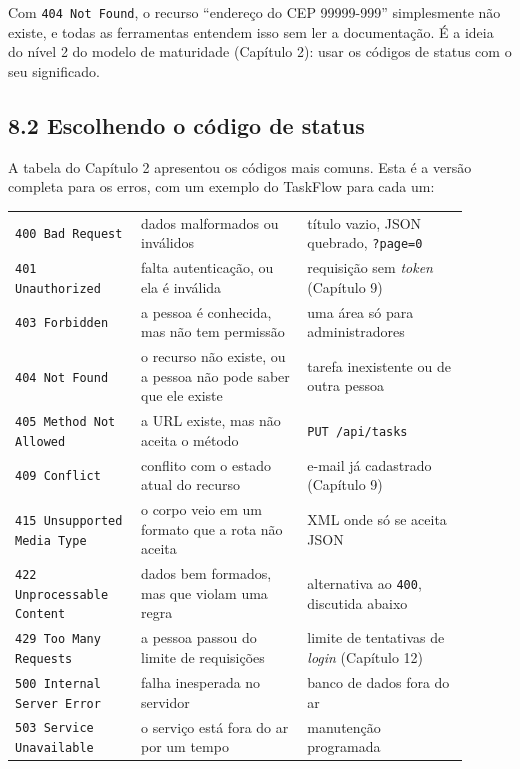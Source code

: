 Com \texttt{404 Not Found}, o recurso ``endereço do CEP 99999-999'' simplesmente não existe, e todas as ferramentas entendem isso sem ler a documentação. É a ideia do nível 2 do modelo de maturidade (Capítulo 2): usar os códigos de status com o seu significado.

\subsection{8.2 Escolhendo o código de status}

A tabela do Capítulo 2 apresentou os códigos mais comuns. Esta é a versão completa para os erros, com um exemplo do TaskFlow para cada um:

\begin{center}
\begin{tabular}{@{}P{0.25\linewidth}P{0.33\linewidth}P{0.32\linewidth}@{}}
\toprule
{}
 &  &  \\
\midrule
\texttt{400 Bad Request} & dados malformados ou inválidos & título vazio, JSON quebrado, \texttt{?page=0} \\
 \texttt{401 Unauthorized} & falta autenticação, ou ela é inválida & requisição sem \textit{token} (Capítulo 9) \\
\texttt{403 Forbidden} & a pessoa é conhecida, mas não tem permissão & uma área só para administradores \\
 \texttt{404 Not Found} & o recurso não existe, ou a pessoa não pode saber que ele existe & tarefa inexistente ou de outra pessoa \\
\texttt{405 Method Not Allowed} & a URL existe, mas não aceita o método & \texttt{PUT /api/tasks} \\
 \texttt{409 Conflict} & conflito com o estado atual do recurso & e-mail já cadastrado (Capítulo 9) \\
\texttt{415 Unsupported Media Type} & o corpo veio em um formato que a rota não aceita & XML onde só se aceita JSON \\
 \texttt{422 Unprocessable Content} & dados bem formados, mas que violam uma regra & alternativa ao \texttt{400}, discutida abaixo \\
\texttt{429 Too Many Requests} & a pessoa passou do limite de requisições & limite de tentativas de \textit{login} (Capítulo 12) \\
 \texttt{500 Internal Server Error} & falha inesperada no servidor & banco de dados fora do ar \\
\texttt{503 Service Unavailable} & o serviço está fora do ar por um tempo & manutenção programada \\
\bottomrule
\end{tabular}
\end{center}


